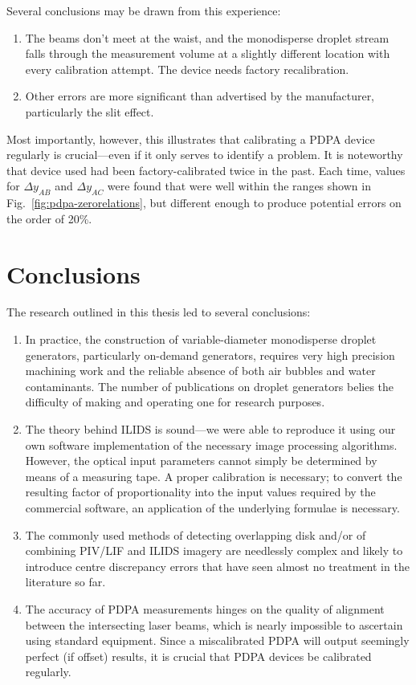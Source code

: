 \documentclass[11.5pt,oneside]{book}
\newcommand*{\figref}[1]{Fig.~\ref{#1}}
\begin{document}
Several conclusions may be drawn from this experience:
\begin{enumerate}
  \item The beams don't meet at the waist, and the monodisperse droplet stream
    falls through the measurement volume at a slightly different location with
    every calibration attempt. The device needs factory recalibration.
  \item Other errors are more significant than advertised by the manufacturer,
    particularly the slit effect.
\end{enumerate}

Most importantly, however, this illustrates that calibrating a PDPA device
regularly is crucial---even if it only serves to identify a problem. It is
noteworthy that device used had been factory-calibrated twice in the past. Each
time, values for $\Delta y_{AB}$ and $\Delta y_{AC}$ were found that were well
within the ranges shown in \figref{fig:pdpa-zerorelations}, but different enough
to produce potential errors on the order of 20\%.

\chapter{Conclusions}
The research outlined in this thesis led to several conclusions:
\begin{enumerate}
  \item In practice, the construction of variable-diameter monodisperse
  droplet generators, particularly on-demand generators, requires
  very high precision machining work and the reliable absence of both
  air bubbles and water contaminants. The number of publications on droplet
  generators belies the difficulty of making and operating one for research
  purposes.
\item The theory behind ILIDS is sound---we were able to reproduce it using our
  own software implementation of the necessary image processing algorithms.
  However, the optical input parameters cannot simply be determined by means of
  a measuring tape. A proper calibration is necessary; to convert the resulting
  factor of proportionality into the input values required by the commercial
  software, an application of the underlying formulae is necessary.
\item The commonly used methods of detecting overlapping disk and/or of
  combining PIV/LIF and ILIDS imagery are needlessly complex and likely to
  introduce centre discrepancy errors that have seen almost no treatment in the
  literature so far.
\item The accuracy of PDPA measurements hinges on the quality of alignment
  between the intersecting laser beams, which is nearly impossible to ascertain
  using standard equipment. Since a miscalibrated PDPA will output seemingly
  perfect (if offset) results, it is crucial that PDPA devices be calibrated
  regularly.
\end{enumerate}
\end{document}

